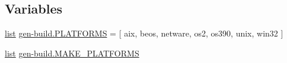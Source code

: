\subsection*{Variables}
\begin{DoxyCompactItemize}
\item 
\hyperlink{pcregrep_8txt_aeb6b944e4524f915483b5696b7f2f424}{list} \hyperlink{namespacegen-build_a6482e6bb2675ffd159f402ddc5582e9e}{gen-\/build.\+P\+L\+A\+T\+F\+O\+R\+MS} = \mbox{[} \textquotesingle{}aix\textquotesingle{}, \textquotesingle{}beos\textquotesingle{}, \textquotesingle{}netware\textquotesingle{}, \textquotesingle{}os2\textquotesingle{}, \textquotesingle{}os390\textquotesingle{}, \textquotesingle{}unix\textquotesingle{}, \textquotesingle{}win32\textquotesingle{} \mbox{]}
\item 
\hyperlink{pcregrep_8txt_aeb6b944e4524f915483b5696b7f2f424}{list} \hyperlink{namespacegen-build_a5f35a11490cb7a34729806229e259267}{gen-\/build.\+M\+A\+K\+E\+\_\+\+P\+L\+A\+T\+F\+O\+R\+MS}
\end{DoxyCompactItemize}
